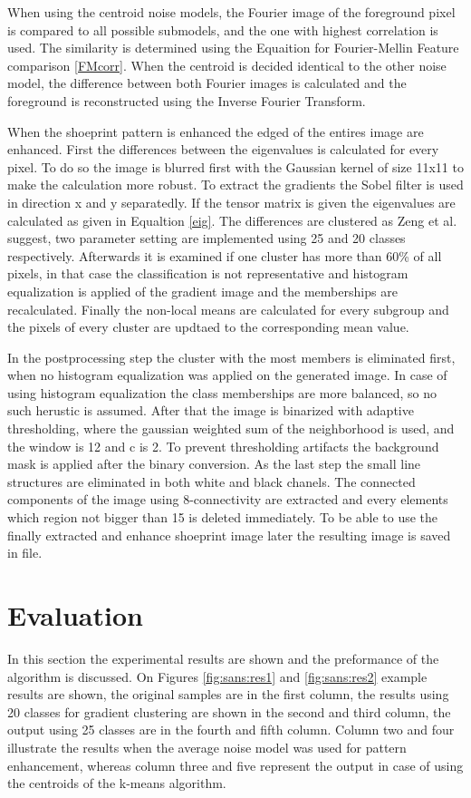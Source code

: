 \documentclass[draft,final]{vutinfth} %
\begin{document}
When using the centroid noise models, the Fourier image of the foreground pixel is compared to all possible submodels, and the one with highest correlation is used.
The similarity is determined using the Equaition for Fourier-Mellin Feature comparison \ref{FMcorr}.
When the centroid is decided identical to the other noise model, the difference between both Fourier images is calculated and the foreground is reconstructed using the Inverse Fourier Transform.
\par
When the shoeprint pattern is enhanced the edged of the entires image are enhanced.
First the differences between the eigenvalues is calculated for every pixel.
To do so the image is blurred first with the Gaussian kernel of size 11x11 to make the calculation more robust.
To extract the gradients the Sobel filter is used in direction x and y separatedly.
If the tensor matrix is given the eigenvalues are calculated as given in Equaltion \ref{eig}.
The differences are clustered as  Zeng et al. \cite{zeng2011region} suggest, two parameter setting are implemented using 25 and 20 classes respectively.
Afterwards it is examined if one cluster has more than 60\% of all pixels, in that case the classification is not representative and histogram equalization is applied of the gradient image and the memberships are recalculated.
Finally the non-local means are calculated for every subgroup and the pixels of every cluster are updtaed to the corresponding mean value.
\par
In the postprocessing step the cluster with the most members is eliminated first, when no histogram equalization was applied on the generated image.
In case of using histogram equalization the class memberships are more balanced, so no such herustic is assumed.
After that the image is binarized with adaptive thresholding, where  the gaussian weighted sum of the neighborhood is used, and the window is 12 and c is 2.
To prevent thresholding artifacts the background mask is applied after the binary conversion.
As the last step the small line structures are eliminated in both white and black chanels.
The connected components of the image using 8-connectivity are extracted and every elements which region not bigger than 15 is deleted immediately.
To be able to use the finally extracted and enhance shoeprint image later the resulting image is saved in file.

\section{Evaluation}
\par
In this section the experimental results are shown and the preformance of the algorithm is discussed.
On Figures \ref{fig:sans:res1} and \ref{fig:sans:res2} example results are shown, the original samples are in the first column, the results using 20 classes for gradient clustering are shown in the second and third column, the output using 25 classes are in the fourth and fifth column.
Column two and four illustrate the results when the average noise model was used for pattern enhancement, whereas column three and five represent the output in case of using the centroids of the k-means algorithm.
\end{document}
